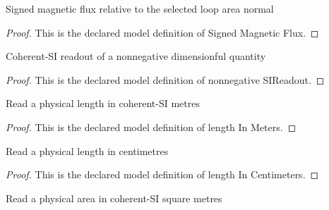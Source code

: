 \begin{definition}
  \label{def:physics:phyx-mini-0925:phyxminiproblems-problemphyxmini0925-signedmagneticflux}
  Signed magnetic flux relative to the selected loop area normal
\end{definition}
\begin{proof}
  This is the declared model definition of Signed Magnetic Flux.
\end{proof}
\begin{definition}
  \label{def:physics:phyx-mini-0925:phyxminiproblems-problemphyxmini0925-nonnegativesireadout}
  Coherent-SI readout of a nonnegative dimensionful quantity
\end{definition}
\begin{proof}
  This is the declared model definition of nonnegative SIReadout.
\end{proof}
\begin{definition}
  \label{def:physics:phyx-mini-0925:phyxminiproblems-problemphyxmini0925-lengthinmeters}
  Read a physical length in coherent-SI metres
\end{definition}
\begin{proof}
  This is the declared model definition of length In Meters.
\end{proof}
\begin{definition}
  \label{def:physics:phyx-mini-0925:phyxminiproblems-problemphyxmini0925-lengthincentimeters}
  Read a physical length in centimetres
\end{definition}
\begin{proof}
  This is the declared model definition of length In Centimeters.
\end{proof}
\begin{definition}
  \label{def:physics:phyx-mini-0925:phyxminiproblems-problemphyxmini0925-areainsquaremeters}
  Read a physical area in coherent-SI square metres
\end{definition}
